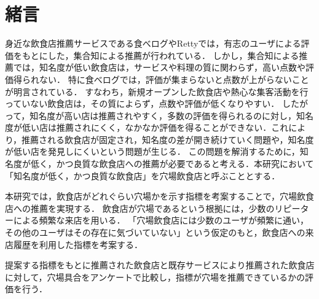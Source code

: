 \chapter{緒言}
\label{chap:intro}
身近な飲食店推薦サービスである食べログやRettyでは，有志のユーザによる評価をもとにした，集合知による推薦が行われている．
しかし，集合知による推薦では，知名度が低い飲食店は，サービスや料理の質に関わらず，高い点数や評価得られない．
特に食べログでは，評価が集まらないと点数が上がらないことが明言されている\cite{score}．
すなわち，新規オープンした飲食店や熱心な集客活動を行っていない飲食店は，その質によらず，点数や評価が低くなりやすい．
したがって，知名度が高い店は推薦されやすく，多数の評価を得られるのに対し，知名度が低い店は推薦されにくく，なかなか評価を得ることができない．これにより，推薦される飲食店が固定され，知名度の差が開き続けていく問題や，知名度が低い店を発見しにくいという問題が生じる．
この問題を解消するために，知名度が低く，かつ良質な飲食店への推薦が必要であると考える．本研究において「知名度が低く，かつ良質な飲食店」を穴場飲食店と呼ぶこととする．

本研究では，飲食店がどれぐらい穴場かを示す指標を考案することで，穴場飲食店への推薦を実現する．
飲食店が穴場であるという根拠には，少数のリピーターによる頻繁な来店を用いる．
「穴場飲食店には少数のユーザが頻繁に通い，その他のユーザはその存在に気づいていない」という仮定のもと，飲食店への来店履歴を利用した指標を考案する．

提案する指標をもとに推薦された飲食店と既存サービスにより推薦された飲食店に対して，穴場具合をアンケートで比較し，指標が穴場を推薦できているかの評価を行う．
